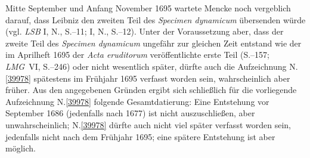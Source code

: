 Mitte September und Anfang November 1695 wartete Mencke noch vergeblich darauf, dass Leibniz den zweiten Teil des \textit{Specimen dynamicum} übersenden würde (vgl. \textit{LSB} I, N., S.--11;\cite{02559} I, N., S.--12).\cite{02560}
Unter der Voraussetzung aber, dass der zweite Teil des \textit{Specimen dynamicum} ungefähr zur gleichen Zeit entstand wie der im Aprilheft 1695 der \textit{Acta eruditorum} veröffentlichte erste Teil (S.--157;\cite{02032} \textit{LMG}~VI, S.--246)\cite{01043} oder nicht wesentlich später, dürfte auch die Aufzeichnung N.\;\ref{39978} spätestens im Frühjahr 1695 verfasst worden sein, wahrscheinlich aber früher.
\pend%
\pstart%
Aus den angegebenen Gründen ergibt sich schließlich für die vorliegende Aufzeichnung N.\;\ref{39978} folgende Gesamtdatierung:
Eine Entstehung vor September 1686 (jedenfalls nach 1677) ist nicht auszuschließen, aber unwahrscheinlich;
N.\;\ref{39978} dürfte auch nicht viel später verfasst worden sein, jedenfalls nicht nach dem Frühjahr 1695; eine spätere Entstehung ist aber möglich.
\pend%
%
\frenchspacing%
\normalsize%

